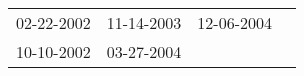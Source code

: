 \begin{supertabular}{llll}
 02-22-2002 &  11-14-2003 &  12-06-2004 \\
 10-10-2002 &  03-27-2004 &             \\
\end{supertabular}
